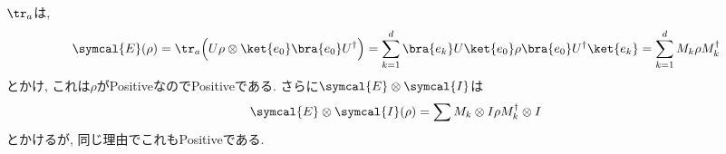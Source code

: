   $\tr_a$は, 
  \begin{equation}
    \symcal{E}(\rho)=\tr_a\Big(U\rho\otimes\ket{e_0}\bra{e_0}U^\dag\Big)=\sum_{k=1}^d\bra{e_k}U\ket{e_0}\rho\bra{e_0}U^\dag\ket{e_k}=\sum_{k=1}^dM_k\rho M_k^\dag
  \end{equation}
  とかけ, これは$\rho$がPositiveなのでPositiveである. 
  さらに$\symcal{E}\otimes \symcal{I}$は
  \begin{equation}
    \symcal{E}\otimes \symcal{I}(\rho)=\sum M_k \otimes I\rho M_k^\dag\otimes I
  \end{equation}
  とかけるが, 同じ理由でこれもPositiveである. 